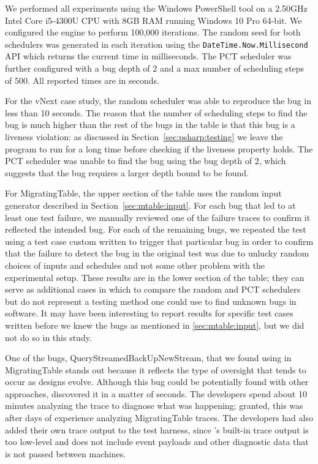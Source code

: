 We performed all experiments using the Windows PowerShell tool on a 2.50GHz Intel Core i5-4300U CPU with 8GB RAM running Windows 10 Pro 64-bit. We configured the engine to perform 100,000 iterations. The random seed for both schedulers was generated in each iteration using the \texttt{DateTime.Now.Millisecond} API which returns the current time in milliseconds. The PCT scheduler was further configured with a bug depth of 2 and a max number of scheduling steps of 500. All reported times are in seconds.

For the vNext case study, the random scheduler was able to reproduce the bug in less than 10 seconds. The reason that the number of scheduling steps to find the bug is much higher than the rest of the bugs in the table is that this bug is a liveness violation: as discussed in Section~\ref{sec:psharp:testing} we leave the program to run for a long time before checking if the liveness property holds. The PCT scheduler was unable to find the bug using the bug depth of 2, which suggests that the bug requires a larger depth bound to be found.

For MigratingTable, the upper section of the table uses the random input generator described in Section~\ref{sec:mtable:input}.  For each bug that led to at least one test failure, we manually reviewed one of the failure traces to confirm it reflected the intended bug.  For each of the remaining bugs, we repeated the test using a test case custom written to trigger that particular bug in order to confirm that the failure to detect the bug in the original test was due to unlucky random choices of inputs and schedules and not some other problem with the experimental setup.  These results are in the lower section of the table; they can serve as additional cases in which to compare the random and PCT schedulers but do not represent a testing method one could use to find unknown bugs in software.  It may have been interesting to report results for specific test cases written before we knew the bugs as mentioned in \ref{sec:mtable:input}, but we did not do so in this study. 

One of the bugs, QueryStreamedBackUpNewStream, that we found using \psharp in MigratingTable stands out because it reflects the type of oversight that tends to occur as designs evolve. Although this bug could be potentially found with other approaches, \psharp discovered it in a matter of seconds. The developers spend about 10 minutes analyzing the trace to diagnose what was happening; granted, this was after days of experience analyzing MigratingTable traces. The developers had also added their own trace output to the \psharp test harness, since \psharp's built-in trace output is too low-level and does not include event payloads and other diagnostic data that is not passed between machines.


